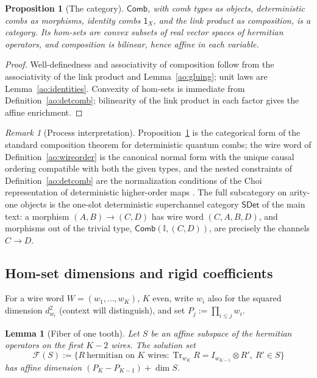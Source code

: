 \documentclass[11pt,a4paper]{article}
\theoremstyle{definition}
\theoremstyle{plain}
\newtheorem{lemma}[theorem]{Lemma}
\newtheorem{proposition}[theorem]{Proposition}
\theoremstyle{remark}
\newtheorem{remark}[theorem]{Remark}
\DeclareMathOperator{\Tr}{Tr}
\newcommand{\Comb}{\mathsf{Comb}}
\newcommand{\SDet}{\mathsf{SDet}}
\begin{document}
\begin{proposition}[The category]
\label{ao:category-prop}
$\Comb$, with comb types as objects, deterministic combs as morphisms,
identity combs $\mathsf 1_X$, and the link product as composition, is a
category. Its hom-sets are convex subsets of real vector spaces of
hermitian operators, and composition is bilinear, hence affine in each
variable.
\end{proposition}

\begin{proof}
Well-definedness and associativity of composition follow from the
associativity of the link product and Lemma~\ref{ao:gluing}; unit laws are
Lemma~\ref{ao:identities}. Convexity of hom-sets is immediate from
Definition~\ref{ao:detcomb}; bilinearity of the link product in each factor
gives the affine enrichment.
\end{proof}

\begin{remark}[Process interpretation]
Proposition~\ref{ao:category-prop} is the categorical form of the standard
composition theorem for deterministic quantum combs; the wire word of
Definition~\ref{ao:wireorder} is the canonical normal form with the unique
causal ordering compatible with both the given types, and the nested
constraints of Definition~\ref{ao:detcomb} are the normalization conditions of
the Choi representation of deterministic higher-order maps
\cite{chiribella2009,chiribella2013,bisioperinotti2019}. The full subcategory on
arity-one objects is the one-slot deterministic superchannel category $\SDet$ of the
main text:
a morphism $(A,B)\to(C,D)$ has wire word $(C,A,B,D)$, and
morphisms out of the trivial type, $\Comb(\mathbb I,(C,D))$, are precisely
the channels $C\to D$.
\end{remark}

\subsection{Hom-set dimensions and rigid coefficients}
\label{ao:dimension}

For a wire word $W=(w_1,\dots,w_{K})$, $K$ even, write $w_i$ also for the
squared dimension $d_{w_i}^2$ (context will distinguish), and set
$P_j:=\prod_{i\le j}w_i$.

\begin{lemma}[Fiber of one tooth]
\label{ao:fiber}
Let $S$ be an affine subspace of the hermitian operators on the first $K-2$
wires. The solution set
\[
\mathcal F(S):=\{R\ \text{hermitian on } K \text{ wires}:
\Tr_{w_K}R=I_{w_{K-1}}\otimes R',\ R'\in S\}
\]
has affine dimension $(P_K-P_{K-1})+\dim S$.
\end{lemma}
\end{document}
